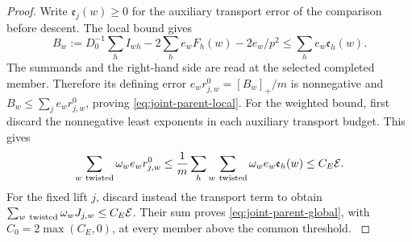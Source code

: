 \begin{proof}
Write \(\mathfrak e_j(w)\ge0\) for the auxiliary
transport error of the comparison before descent. The local
bound gives
\[
   B_w:=D_0^{-1}\sum_h I_{wh}
         -2\sum_h e_wF_h(w)-2e_w/p^2
       \le \sum_h e_w\mathfrak e_h(w).
\]
The summands and the right-hand side are read at the selected
completed member. Therefore its defining error
\(e_w r^0_{j,w}=[B_w]_+/m\) is nonnegative and
\(B_w\le\sum_j e_w r^0_{j,w}\), proving
\eqref{eq:joint-parent-local}. For the weighted bound, first
discard the nonnegative least exponents in each auxiliary
transport budget. This gives
\[
 \sum_{w\ {\rm twisted}}\omega_w e_w r^0_{j,w}
 \le \frac1m\sum_h\sum_{w\ {\rm twisted}}
                    \omega_w e_w\mathfrak e_h(w)
 \le C_E\mathcal E.
\]
For the fixed lift \(j\), discard instead the transport term
to obtain \(\sum_{w\ {\rm twisted}}\omega_w J_{j,w}\le C_E\mathcal E\).
Their sum proves \eqref{eq:joint-parent-global}, with
\(C_0=2\max(C_E,0)\), at every member above the common threshold. \label{cor:joint-family-estimate-8}
\end{proof}
